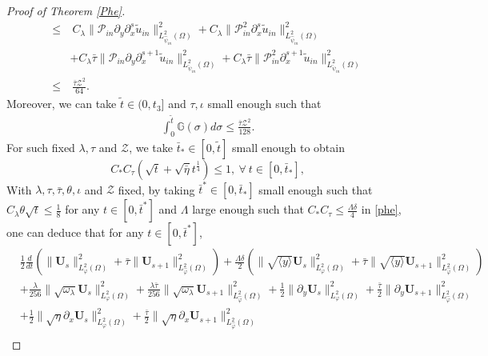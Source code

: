 \documentclass{amsart}
\numberwithin{equation}{section}
\newcommand\y{{{\langle y \rangle}}}
\begin{document}
\begin{proof}[Proof of Theorem \ref{Phe}]
\begin{align}
\leq&~C_{\lambda}\|\mathcal{P}_{in}\partial_{y}\partial_{x}^{s}\tilde{u}_{in}\|_{L_{\hat{\psi}_{in}}^{2}(\Omega)}^{2}
     +C_{\lambda}\|\mathcal{P}_{in}^{2}\partial_{x}^{s}\tilde{u}_{in}\|_{L_{\hat{\psi}_{in}}^{2}(\Omega)}^{2}\nonumber\\
    &+C_{\lambda}\bar{\tau}\|\mathcal{P}_{in}\partial_{y}\partial_{x}^{s+1}\tilde{u}_{in}\|_{L_{\check{\psi}_{in}}^{2}(\Omega)}^{2}
     +C_{\lambda}\bar{\tau}\|\mathcal{P}_{in}^{2}\partial_{x}^{s+1}\tilde{u}_{in}\|_{L_{\check{\psi}_{in}}^{2}(\Omega)}^{2}\nonumber\\
\leq&~\frac{\bar{\tau}\mathcal{Z}^{2}}{64}.\nonumber
\end{align}
Moreover, we can take $\tilde{t}\in(0,t_{3}]$ and $\tau, \iota$ small enough such that
\begin{align}\label{G}
\int_{0}^{\tilde{t}}\mathbb{G}(\sigma)d\sigma\leq \frac{\bar{\tau}\mathcal{Z}^{2}}{128}.
\end{align}
For such fixed $\lambda,\tau$ and $\mathcal{Z}$, we take $\bar{t}_{*}\in[0,\tilde{t}]$ small enough to obtain
$$C_{*}C_{\tau}(\sqrt{t}+\sqrt{\bar{\eta}}t^{\frac{1}{4}})\leq 1,~\forall~t\in[0,\bar{t}_{*}],$$
With $\lambda,\tau,\bar{\tau},\theta,\iota$ and $\mathcal{Z}$ fixed, by taking $\bar{t}^{*}\in [0,\bar{t}_{*}]$ small enough such that $C_{\lambda}\theta\sqrt{t}\leq \frac{1}{8}$ for any $t\in[0,\bar{t}^{*}]$ and  $\Lambda$ large enough such that $C_{*}C_{\tau}\leq \frac{\Lambda\delta}{4}$ in \eqref{phe}, one can deduce that for any $t\in[0,\bar{t}^{*}]$,
\begin{align}\label{phe0}
&\frac{1}{2}\frac{d}{dt}\left(\|\mathbf{U}_{s}\|_{L_{\varphi}^{2}(\Omega)}^{2}+\bar{\tau}\|\mathbf{U}_{s+1}\|_{L_{\hat{\varphi}}^{2}(\Omega)}^{2}\right)
 +\frac{\Lambda\delta}{2}\left(\|\sqrt{\y}\mathbf{U}_{s}\|_{L_{\varphi}^{2}(\Omega)}^{2}+\bar{\tau}\|\sqrt{\y}\mathbf{U}_{s+1}\|_{L_{\hat{\varphi}}^{2}(\Omega)}^{2}\right)\\
&+\frac{\lambda}{256}\|\sqrt{\omega_{\lambda}}\mathbf{U}_{s}\|_{L_{\varphi}^{2}(\Omega)}^{2}
 +\frac{\lambda\bar{\tau}}{256}\|\sqrt{\omega_{\lambda}}\mathbf{U}_{s+1}\|_{L_{\hat{\varphi}}^{2}(\Omega)}^{2}
 +\frac{1}{2}\|\partial_{y}\mathbf{U}_{s}\|_{L_{\varphi}^{2}(\Omega)}^{2}
 +\frac{\bar{\tau}}{2}\|\partial_{y}\mathbf{U}_{s+1}\|_{L_{\hat{\varphi}}^{2}(\Omega)}^{2}\nonumber\\
&+\frac{1}{2}\|\sqrt{\eta}\partial_{x}\mathbf{U}_{s}\|_{L_{\varphi}^{2}(\Omega)}^{2}
 +\frac{\bar{\tau}}{2}\|\sqrt{\eta}\partial_{x}\mathbf{U}_{s+1}\|_{L_{\hat{\varphi}}^{2}(\Omega)}^{2}\nonumber\\

\end{align}
\end{proof}
\end{document}
